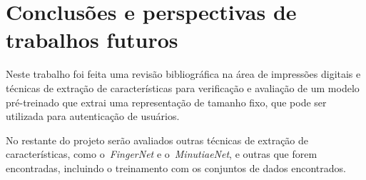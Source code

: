 \section{Conclusões e perspectivas de trabalhos futuros}\label{sec:conclusao}

Neste trabalho foi feita uma revisão bibliográfica na área de impressões digitais e técnicas de extração de características para verificação e avaliação de um modelo pré-treinado que extrai uma representação de tamanho fixo, que pode ser utilizada para autenticação de usuários.

No restante do projeto serão avaliados outras técnicas de extração de características, como o~\textit{FingerNet} e o~\textit{MinutiaeNet}, e outras que forem encontradas, incluindo o treinamento com os conjuntos de dados encontrados.

